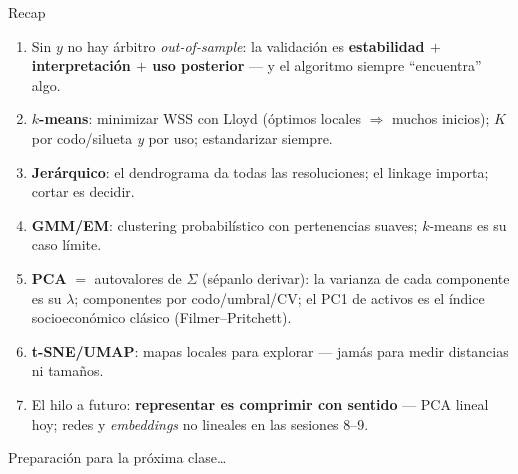 \documentclass{beamer}
\newcommand{\1}{\mathbb{I}}
\begin{document}
\begin{frame}{Recap}
\small
\begin{enumerate}\itemsep6pt
  \item Sin $y$ no hay árbitro \emph{out-of-sample}: la validación es \textbf{estabilidad $+$ interpretación $+$ uso posterior} --- y el algoritmo siempre ``encuentra'' algo.
  \item \textbf{$k$-means}: minimizar WSS con Lloyd (óptimos locales $\Rightarrow$ muchos inicios); $K$ por codo/silueta \emph{y} por uso; estandarizar siempre.
  \item \textbf{Jerárquico}: el dendrograma da todas las resoluciones; el linkage importa; cortar es decidir.
  \item \textbf{GMM/EM}: clustering probabilístico con pertenencias suaves; $k$-means es su caso límite.
  \item \textbf{PCA} $=$ autovalores de $\Sigma$ (sépanlo derivar): la varianza de cada componente es su $\lambda$; componentes por codo/umbral/CV; el PC1 de activos es el índice socioeconómico clásico (Filmer--Pritchett).
  \item \textbf{t-SNE/UMAP}: mapas locales para explorar --- jamás para medir distancias ni tamaños.
  \item El hilo a futuro: \textbf{representar es comprimir con sentido} --- PCA lineal hoy; redes y \emph{embeddings} no lineales en las sesiones 8--9.
\end{enumerate}
\end{frame}

\begin{frame}
\vspace{2.0cm}
\Large{Preparación para la próxima clase\ldots}
\end{frame}

\end{document}
